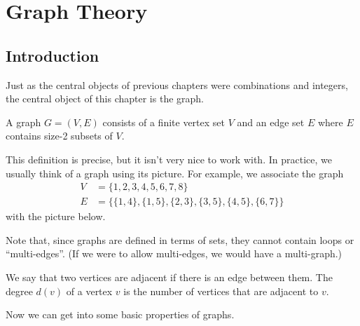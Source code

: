 \documentclass[../m55main.tex]{subfiles}
\begin{document}
\chapter{Graph Theory}

\section{Introduction}
Just as the central objects of previous chapters were combinations and integers, the central object of this chapter is the graph.

\begin{definition}[Graph]
    A graph $G = (V,E)$ consists of a finite vertex set $V$ and an edge set $E$ where $E$ contains size-2 subsets of $V$.
\end{definition}

This definition is precise, but it isn't very nice to work with.
In practice, we usually think of a graph using its picture.
For example, we associate the graph
\begin{align*}
    V &= \{ 1, 2, 3, 4, 5, 6, 7, 8 \} \\
    E &= \Big\{ \{ 1,4 \}, \{ 1,5 \}, \{ 2,3 \}, \{ 3,5 \}, \{ 4,5 \}, \{ 6,7 \} \Big\}
\end{align*}
with the picture below.

\begin{center}
\end{center}

Note that, since graphs are defined in terms of sets, they cannot contain loops or ``multi-edges''.
(If we were to allow multi-edges, we would have a multi-graph.)

We say that two vertices are adjacent if there is an edge between them.
The degree $d(v)$ of a vertex $v$ is the number of vertices that are adjacent to $v$.

Now we can get into some basic properties of graphs.
\end{document}
